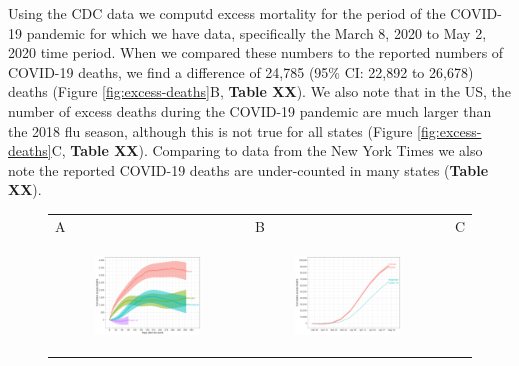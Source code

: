 \documentclass[11pt]{article}
\begin{document}
Using the CDC data we computd excess mortality for the period of the COVID-19 pandemic for which we have data, specifically the March 8, 2020 to May 2, 2020 time period. When we compared these numbers to the reported numbers of COVID-19 deaths, we find a difference of 24,785 (95\% CI: 22,892 to 26,678) deaths (Figure \ref{fig:excess-deaths}B, \textbf{Table XX}). We also note that in the US, the number of excess deaths during the COVID-19 pandemic are much larger than the 2018 flu season, although this is not true for all states (Figure \ref{fig:excess-deaths}C, \textbf{Table XX}). Comparing to data from the New York Times \cite{smith2020coronavirus} we also note the reported COVID-19 deaths are under-counted in many states (\textbf{Table XX}).

\begin{figure}[ht]
	\begin{tabular}{lll}
	A&B&C\\
	\begin{subfigure}[t]{0.3\linewidth}
		\centering
		\includegraphics[width=1\linewidth]{figs/figure-2a.pdf} 
	\end{subfigure}&
	\begin{subfigure}[t]{0.3\linewidth}
		\centering
		\includegraphics[width=1\linewidth]{figs/figure-2b.pdf}

\end{subfigure}
\end{tabular}
\end{figure}
\end{document}
